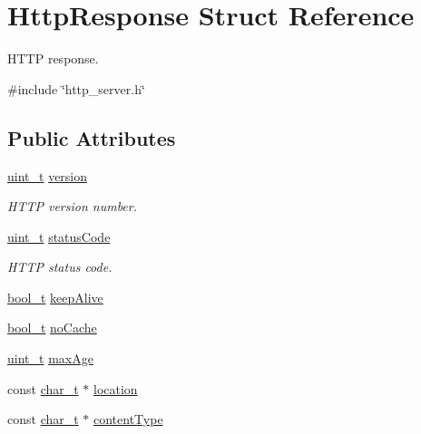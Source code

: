 \hypertarget{structHttpResponse}{}\section{Http\+Response Struct Reference}
\label{structHttpResponse}


H\+T\+TP response.  




{\ttfamily \#include \char`\"{}http\+\_\+server.\+h\char`\"{}}

\subsection*{Public Attributes}
\begin{DoxyCompactItemize}
\item 
\hyperlink{compiler__port_8h_a12a1e9b3ce141648783a82445d02b58d}{uint\+\_\+t} \hyperlink{structHttpResponse_a5b464404cde85d38302f5a0bb52b07c2}{version}
\begin{DoxyCompactList}\small\item\em H\+T\+TP version number. \end{DoxyCompactList}\item 
\hyperlink{compiler__port_8h_a12a1e9b3ce141648783a82445d02b58d}{uint\+\_\+t} \hyperlink{structHttpResponse_a6ea57a72996cbdfffa977ea8cbc65a85}{status\+Code}
\begin{DoxyCompactList}\small\item\em H\+T\+TP status code. \end{DoxyCompactList}\item 
\hyperlink{compiler__port_8h_a812d16e5494522586b3784e55d479912}{bool\+\_\+t} \hyperlink{structHttpResponse_ae4aed74270561d53c2d0f7b8b7a5ac18}{keep\+Alive}
\item 
\hyperlink{compiler__port_8h_a812d16e5494522586b3784e55d479912}{bool\+\_\+t} \hyperlink{structHttpResponse_a0a2cc8326bd2fe070e0981ae3d5bfc2b}{no\+Cache}
\item 
\hyperlink{compiler__port_8h_a12a1e9b3ce141648783a82445d02b58d}{uint\+\_\+t} \hyperlink{structHttpResponse_a81dcedfb48458b36d8c6909a1ec71b25}{max\+Age}
\item 
const \hyperlink{compiler__port_8h_a40bb5262bf908c328fbcfbe5d29d0201}{char\+\_\+t} $\ast$ \hyperlink{structHttpResponse_aad108bd91274637be13ab0399b247e59}{location}
\item 
const \hyperlink{compiler__port_8h_a40bb5262bf908c328fbcfbe5d29d0201}{char\+\_\+t} $\ast$ \hyperlink{structHttpResponse_acffc28008e9e2b70cf89d3456ecbe4f3}{content\+Type}

\end{DoxyCompactItemize}
